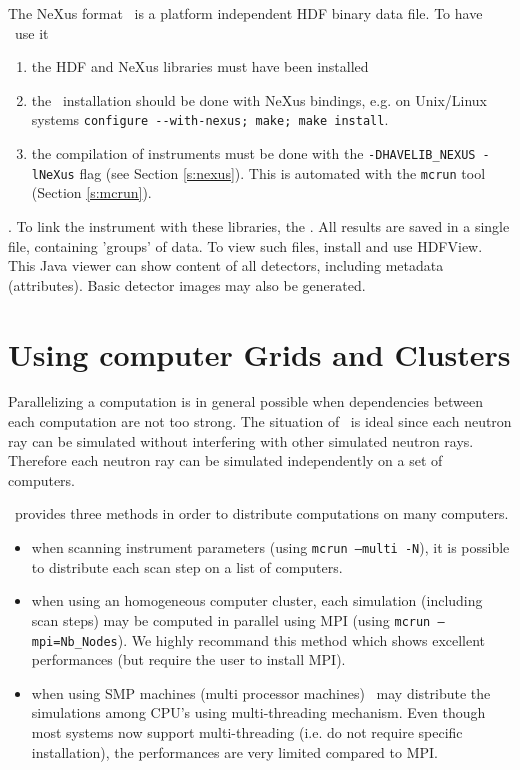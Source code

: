 The NeXus format~\cite{nexus_webpage} is a platform independent HDF binary data file. To have \MCS\ use it
\begin{enumerate}
\item the HDF and NeXus libraries must have been installed
\item the \MCS\ installation should be done with NeXus bindings, e.g. on Unix/Linux systems \verb+configure --with-nexus; make; make install+.
\item  the compilation of instruments must be done with the \verb+-DHAVELIB_NEXUS -lNeXus+ flag (see Section \ref{s:nexus}). This is automated with the \verb+mcrun+ tool (Section \ref{s:mcrun}).
\end{enumerate}
. To link the instrument with these libraries, the . All results are saved in a single file, containing 'groups' of data. To view such files, install and use HDFView. This Java viewer can show content of all detectors, including metadata (attributes). Basic detector images may also be generated.

\section{Using computer Grids and Clusters}
\label{s:run-mpi}

Parallelizing a computation is in general possible when dependencies between
  each computation are not too strong. The situation of \MCS\ is
  ideal since each neutron ray can be simulated without interfering with
  other simulated neutron rays. Therefore each neutron ray can be simulated
  independently on a set of computers.

\MCS\ provides three methods in order to distribute computations on many computers.
\begin{itemize}
\item when scanning instrument parameters (using \texttt{mcrun --multi -N}),
  it is possible to distribute each scan step on a list of computers.
\item when using an homogeneous computer cluster, each simulation (including scan
  steps) may be computed in parallel using MPI (using \texttt{mcrun
    --mpi=Nb\_Nodes}). We highly recommand this method which shows
  excellent performances (but require the user to install MPI).
\item when using SMP machines (multi processor machines) \MCS\ may
  distribute the simulations among CPU's using multi-threading
  mechanism. Even though most systems now support multi-threading (i.e. do not require specific installation), the performances are very limited compared to MPI.
\end{itemize}

